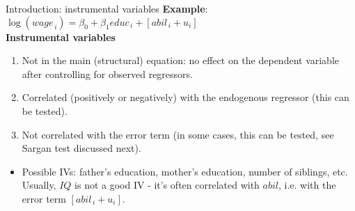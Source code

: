 \documentclass[usenames,dvipsnames]{beamer}
\begin{document}
\begin{frame}{Introduction: instrumental variables}
\textbf{Example}:  $\log(\textit{wage}_{\,i})=\beta_0+\beta_1 \textit{educ}_{\,i}+ [\textit{abil}_{\,i} + u_i]$  \\
\vspace{0.3cm}
\textbf{Instrumental variables}
\begin{enumerate}
\item Not in the main (structural) equation: no effect on the dependent variable after controlling for observed regressors.
\item Correlated (positively or negatively) with the endogenous regressor  (this can be tested).
\item Not correlated with the error term (in some cases, this can be tested, see Sargan test discussed next).
\end{enumerate}
\bigskip
\begin{itemize}
\item Possible IVs: father's education, mother's education, number of siblings, etc.\\ 
\smallskip
Usually, $\textit{IQ}$ is not a good IV - it's often correlated with $\textit{abil}$, i.e. with the error term $[\textit{abil}_{\,i} + u_i]$.
\end{itemize}
\end{frame}
\end{document}
